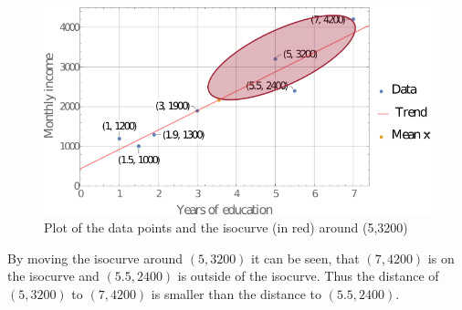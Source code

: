 \documentclass[DIN, pagenumber=false, fontsize=11pt, parskip=half]{scrartcl}
\begin{document}
    \begin{figure}[H]
        \centering
        \includegraphics[width=\textwidth]{A3_2.pdf}
        \caption{Plot of the data points and the isocurve (in red) around (5,3200)}
    \end{figure}
    By moving the isocurve around $(5,3200)$ it can be seen, that $(7,4200)$ is on the isocurve and $(5.5,2400)$ is outside of the isocurve. Thus the distance of $(5,3200)$ to $(7,4200)$ is smaller than the distance to $(5.5,2400)$.
    

    \subsection{}
    
\end{document}
